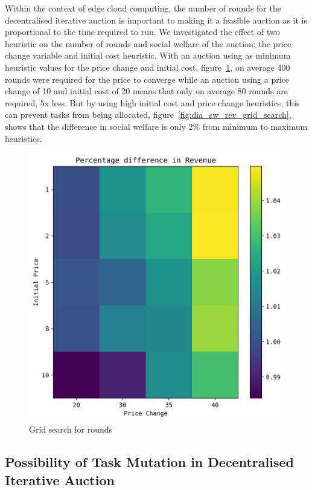 Within the context of edge cloud computing, the number of rounds for the decentralised iterative auction is important
to making it a feasible auction as it is proportional to the time required to run. We investigated the effect of two
heuristic on the number of rounds and social welfare of the auction; the price change variable and initial cost
heuristic. With an auction using as minimum heuristic values for the price change and initial cost,
figure~\ref{fig:dia_rounds_grid_search}, on average 400 rounds were required for the price to converge while an auction
using a price change of 10 and initial cost of 20 means that only on average 80 rounds are required, 5x less. But by
using high initial cost and price change heuristics, this can prevent tasks from being allocated,
figure~\ref{fig:dia_sw_rev_grid_search}, shows that the difference in social welfare is only 2\% from minimum to
maximum heuristics.

\begin{figure}[h]
    \centering
    \includegraphics[width=0.3\linewidth]{figs/dia_heuristics/revenue_grid.png}
    \caption{Grid search for rounds}
    \label{fig:dia_rounds_grid_search}
\end{figure}

\subsection{Possibility of Task Mutation in Decentralised Iterative Auction}
\label{subsec:possibility-of-task-mutation-in-decentralised-iterative-auction}


